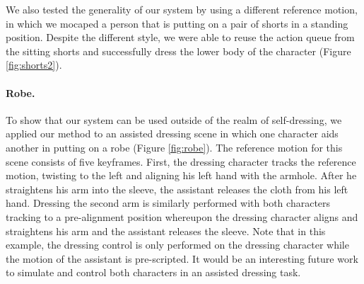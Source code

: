 We also tested the generality of our system by using a different reference motion, in which we mocaped a person that is putting on a pair of shorts in a standing position. Despite the different style, we were able to reuse the action queue from the sitting shorts and successfully dress the lower body of the character (Figure \ref{fig:shorts2}).

\paragraph{Robe.} To show that our system can be used outside of the realm of self-dressing, we applied our method to an assisted dressing scene in which one character aids another in putting on a robe (Figure \ref{fig:robe}). The reference motion for this scene consists of five keyframes. First, the dressing character tracks the reference motion, twisting to the left and aligning his left hand with the armhole. After he straightens his arm into the sleeve, the assistant releases the cloth from his left hand. Dressing the second arm is similarly performed with both characters tracking to a pre-alignment position whereupon the dressing character aligns and straightens his arm and the assistant releases the sleeve. Note that in this example, the dressing control is only performed on the dressing character while the motion of the assistant is pre-scripted. It would be an interesting future work to simulate and control both characters in an assisted dressing task.
